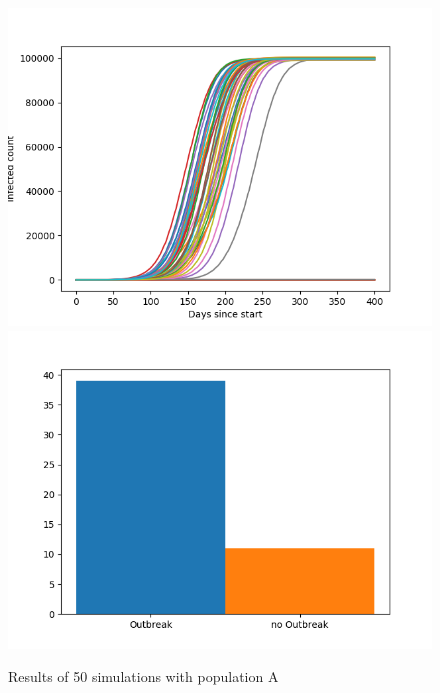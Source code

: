 \documentclass[runningheads]{llncs}
\begin{document}
\begin{figure}
	\includegraphics[width=\textwidth]{outbreaks_populationA.png}
	\includegraphics[width=\textwidth]{barchart_populationA.png}
	\caption{Results of 50 simulations with population A}
\end{figure}
\end{document}
